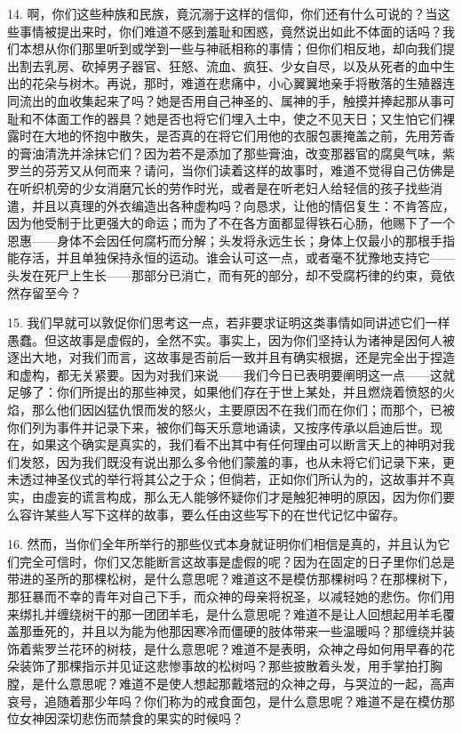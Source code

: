 14. 啊，你们这些种族和民族，竟沉溺于这样的信仰，你们还有什么可说的？当这些事情被提出来时，你们难道不感到羞耻和困惑，竟然说出如此不体面的话吗？我们本想从你们那里听到或学到一些与神祇相称的事情；但你们相反地，却向我们提出割去乳房、砍掉男子器官、狂怒、流血、疯狂、少女自尽，以及从死者的血中生出的花朵与树木。再说，那时，难道在悲痛中，小心翼翼地亲手将散落的生殖器连同流出的血收集起来了吗？她是否用自己神圣的、属神的手，触摸并捧起那从事可耻和不体面工作的器具？她是否也将它们埋入土中，使之不见天日；又生怕它们裸露时在大地的怀抱中散失，是否真的在将它们用他的衣服包裹掩盖之前，先用芳香的膏油清洗并涂抹它们？因为若不是添加了那些膏油，改变那器官的腐臭气味，紫罗兰的芬芳又从何而来？请问，当你们读着这样的故事时，难道不觉得自己仿佛是在听织机旁的少女消磨冗长的劳作时光，或者是在听老妇人给轻信的孩子找些消遣，并且以真理的外衣编造出各种虚构吗？向恳求，让他的情侣复生：不肯答应，因为他受制于比更强大的命运；而为了不在各方面都显得铁石心肠，他赐下了一个恩惠——身体不会因任何腐朽而分解；头发将永远生长；身体上仅最小的那根手指能存活，并且单独保持永恒的运动。谁会认可这一点，或者毫不犹豫地支持它——头发在死尸上生长——那部分已消亡，而有死的部分，却不受腐朽律的约束，竟依然存留至今？\par

15. 我们早就可以敦促你们思考这一点，若非要求证明这类事情如同讲述它们一样愚蠢。但这故事是虚假的，全然不实。事实上，因为你们坚持认为诸神是因何人被逐出大地，对我们而言，这故事是否前后一致并且有确实根据，还是完全出于捏造和虚构，都无关紧要。因为对我们来说——我们今日已表明要阐明这一点——这就足够了：你们所提出的那些神灵，如果他们存在于世上某处，并且燃烧着愤怒的火焰，那么他们因凶猛仇恨而发的怒火，主要原因不在我们而在你们；而那个，已被你们列为事件并记录下来，被你们每天乐意地诵读，又按序传承以启迪后世。现在，如果这个确实是真实的，我们看不出其中有任何理由可以断言天上的神明对我们发怒，因为我们既没有说出那么多令他们蒙羞的事，也从未将它们记录下来，更未透过神圣仪式的举行将其公之于众；但倘若，正如你们所认为的，这故事并不真实，由虚妄的谎言构成，那么无人能够怀疑你们才是触犯神明的原因，因为你们要么容许某些人写下这样的故事，要么任由这些写下的在世代记忆中留存。\par

16. 然而，当你们全年所举行的那些仪式本身就证明你们相信是真的，并且认为它们完全可信时，你们又怎能断言这故事是虚假的呢？因为在固定的日子里你们总是带进的圣所的那棵松树，是什么意思呢？难道这不是模仿那棵树吗？在那棵树下，那狂暴而不幸的青年对自己下手，而众神的母亲将祝圣，以减轻她的悲伤。你们用来绑扎并缠绕树干的那一团团羊毛，是什么意思呢？难道不是让人回想起用羊毛覆盖那垂死的，并且以为能为他那因寒冷而僵硬的肢体带来一些温暖吗？那缠绕并装饰着紫罗兰花环的树枝，是什么意思呢？难道不是表明，众神之母如何用早春的花朵装饰了那棵指示并见证这悲惨事故的松树吗？那些披散着头发，用手掌拍打胸膛，是什么意思呢？难道不是使人想起那戴塔冠的众神之母，与哭泣的一起，高声哀号，追随着那少年吗？你们称为的戒食面包，是什么意思呢？难道不是在模仿那位女神因深切悲伤而禁食的果实的时候吗？\par

